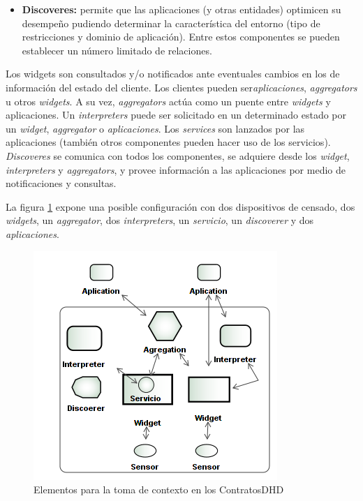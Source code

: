 {\begin{itemize}
\item \textbf{Discoveres:} permite que las aplicaciones (y otras entidades)
optimicen su desempeño pudiendo determinar la característica del entorno
(tipo de restricciones y dominio de aplicación). Entre estos componentes
se pueden establecer un número limitado de relaciones.

\end{itemize}

Los widgets son consultados y/o notificados ante eventuales cambios en los de información del estado del cliente. Los clientes pueden ser\textit{aplicaciones}, \textit{aggregators} u otros \textit{widgets}. A su vez, \textit{aggregators} actúa como un puente entre \textit{widgets} y aplicaciones. Un \textit{interpreters} puede ser solicitado en un determinado estado por un \textit{widget}, \textit{aggregator} o \textit{aplicaciones}. Los \textit{services} son lanzados por las aplicaciones (también otros componentes pueden hacer uso de los servicios). \textit{Discoveres} se comunica con todos los componentes, se adquiere desde los \textit{widget}, \textit{interpreters} y \textit{aggregators}, y provee información a las aplicaciones por medio de notificaciones y consultas.

La figura \ref{fig:toolkit} expone una posible configuración con dos
dispositivos de censado, dos \textit{widgets}, un \textit{aggregator}, dos
\textit{interpreters}, un \textit{servicio}, un \textit{discoverer} y dos
\textit{aplicaciones}.



\begin{figure}
\begin{center}
 \includegraphics [width=5 in,totalheight=2 in]{Ch4/ContextToolsKit.png}
\caption{Elementos para la toma de contexto en los ContratosDHD}
\label{fig:toolkit}
\end{center}
\end{figure}


}
